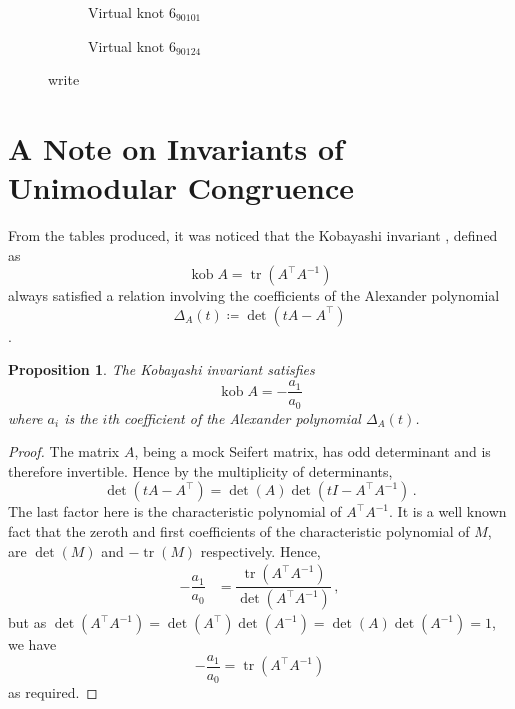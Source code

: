 \documentclass[12pt]{report}
\newcommand{\kob}{\operatorname{kob}}
\newtheorem*{proposition}{Proposition}
\theoremstyle{upright}
\begin{document}
\begin{figure}[H]
	\centering
	\hspace*{\fill}
	\begin{subfigure}[b]{0.4 \textwidth}
		\centering
		\def\svgscale{0.35}
		
		\caption{Virtual knot $6_{90101}$}
		\label{fig:6-90101_vknot}
	\end{subfigure}
	\hspace*{\fill}	\hspace*{\fill}	\hspace*{\fill}
	\begin{subfigure}[b]{0.4 \textwidth}
		\centering
		\def\svgscale{0.35}
		
		\caption{Virtual knot $6_{90124}$}
		\label{fig:6-90124_vknot}
	\end{subfigure}
	\hspace*{\fill} 
	\caption{write}
	\label{fig:counterexamples}
\end{figure}

\section{A Note on Invariants of Unimodular Congruence}

From the tables produced, it was noticed that the Kobayashi invariant \cite{new-invariant-under-congruence}, defined as
\[\kob A = \operatorname{tr}(A^{\top}A^{-1})\]
always satisfied a relation involving the coefficients of the Alexander polynomial
\[\Delta_{A}(t) \coloneq \det(tA - A^{\top})\] \cite{mock-seifert-matrices}.


\begin{proposition}
The Kobayashi invariant satisfies
\[\kob A = -\dfrac{a_{1}}{a_{0}}\]
where $a_{i}$ is the $i$th coefficient of the Alexander polynomial $\Delta_{A}(t)$.
\end{proposition}
\begin{proof}
The matrix $A$, being a mock Seifert matrix, has odd determinant \cite{mock-seifert-matrices} and is therefore invertible. Hence by the multiplicity of determinants,
\[\det(tA - A^{\top}) = \det(A)\det(tI - A^{\top}A^{-1})\,.\]
The last factor here is the characteristic polynomial of $A^{\top}A^{-1}$. It is a well known fact that the zeroth and first coefficients of the characteristic polynomial of $M$, are $\det(M)$ and $-\operatorname{tr}(M)$ respectively. Hence,
\begin{align*}
-\dfrac{a_{1}}{a_{0}}	& = \dfrac{\operatorname{tr}(A^{\top}A^{-1})}{\det(A^{\top}A^{-1})}\,,
\end{align*}
but as $\det(A^{\top}A^{-1}) = \det(A^{\top})\det(A^{-1}) = \det(A)\det(A^{-1}) = 1$, we have
\[-\dfrac{a_{1}}{a_{0}} = \operatorname{tr}(A^{\top}A^{-1})\]
as required.
\end{proof}
\end{document}
